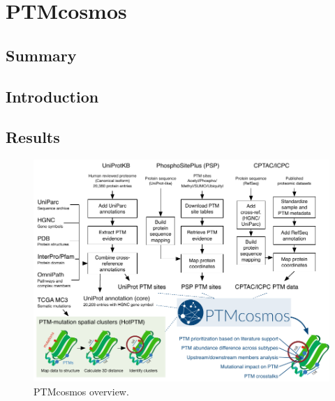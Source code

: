 \chapter{PTMcosmos}
\label{chap:ptmcosmos}



\section{Summary}



\section{Introduction}



\section{Results}


\begin{figure}[tb]
    \centering
    \includegraphics[width=0.9\linewidth]{figures/chap03_ptmcosmos/fig1_ptmcosmos_workflow.pdf}
    \caption[PTMcosmos overview.]{PTMcosmos overview.}
    \label{fig:ptmcosmos-workflow}
\end{figure}

